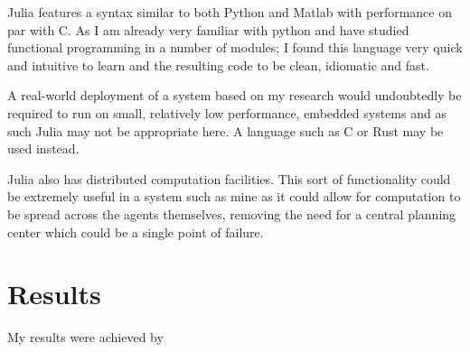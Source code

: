 Julia features a syntax similar to both Python and Matlab with performance on par with C. As I am already very familiar with python and have studied functional programming in a number of modules; I found this language very quick and intuitive to learn and the resulting code to be clean, idiomatic and fast.

A real-world deployment of a system based on my research would undoubtedly be required to run on small, relatively low performance, embedded systems and as such Julia may not be appropriate here. A language such as C or Rust may be used instead.

Julia also has distributed computation facilities. This sort of functionality could be extremely useful in a system such as mine as it could allow for computation to be spread across the agents themselves, removing the need for a central planning center which could be a single point of failure.


\section{Results}

My results were achieved by

